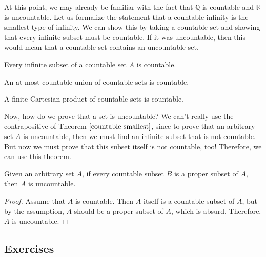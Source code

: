 \documentclass{article}
\begin{document}
    At this point, we may already be familiar with the fact that $\mathbb{Q}$ is countable and $\mathbb{R}$ is uncountable. Let us formalize the statement that a countable infinity is the smallest type of infinity. We can show this by taking a countable set and showing that every infinite subset must be countable. If it was uncountable, then this would mean that a countable set contains an uncountable set. 

    \begin{theorem}
      \label{countable smallest}
      Every infinite subset of a countable set $A$ is countable. 
    \end{theorem}

    \begin{theorem}
      An at most countable union of countable sets is countable. 
    \end{theorem}

    \begin{theorem}
      A finite Cartesian product of countable sets is countable. 
    \end{theorem}

    Now, how do we prove that a set is uncountable? We can't really use the contrapositive of Theorem $\ref{countable smallest}$, since to prove that an arbitrary set $A$ is uncountable, then we must find an infinite subset that is not countable. But now we must prove that this subset itself is not countable, too! Therefore, we can use this theorem. 

    \begin{theorem}
      Given an arbitrary set $A$, if every countable subset $B$ is a proper subset of $A$, then $A$ is uncountable. 
    \end{theorem}
    \begin{proof}
      Assume that $A$ is countable. Then $A$ itself is a countable subset of $A$, but by the assumption, $A$ should be a proper subset of $A$, which is absurd. Therefore, $A$ is uncountable. 
    \end{proof}

  \subsection{Exercises}
\end{document}
